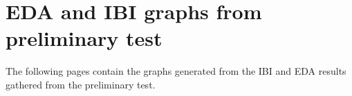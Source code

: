 \chapter{EDA and IBI graphs from preliminary test}\label{ch:appA}
The following pages contain the graphs generated from the IBI and EDA results gathered from the preliminary test.

